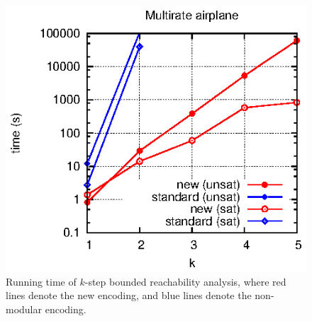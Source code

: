 \begin{figure}
\includegraphics[width=0.45\columnwidth]{plot/airplane-multi.eps}    
\caption{Running time of $k$-step bounded reachability analysis, where red lines denote the new encoding,
and blue lines denote the non-modular encoding.}
\label{table:bounded}
\end{figure}





